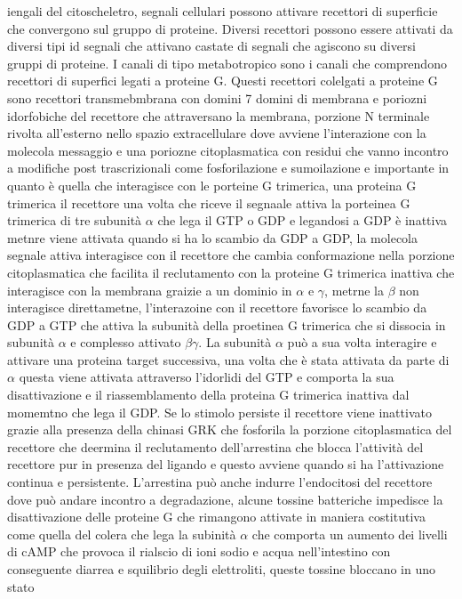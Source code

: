 iengali del citoscheletro, segnali cellulari possono attivare recettori di superficie che convergono sul gruppo di proteine. Diversi recettori possono essere attivati da diversi tipi id
segnali che attivano castate di segnali che agiscono su diversi gruppi di proteine. I canali di tipo metabotropico sono i canali che comprendono recettori di superfici legati a 
proteine G. Questi recettori colelgati a proteine G sono recettori transmebmbrana con domini 7 domini di membrana e poriozni idorfobiche del recettore che attraversano la membrana, 
porzione N terminale rivolta all'esterno nello spazio extracellulare dove avviene l'interazione con la molecola messaggio e una poriozne citoplasmatica con residui che vanno incontro 
a modifiche post trascrizionali come fosforilazione e sumoilazione e importante in quanto \`e quella che interagisce con le porteine G trimerica, una proteina G trimerica il recettore una
volta che riceve il segnaale attiva la porteinea G trimerica di tre subunit\`a $\alpha$ che lega il GTP o GDP e legandosi a GDP \`e inattiva metnre viene attivata quando si ha lo scambio 
da GDP a GDP, la molecola segnale attiva interagisce con il recettore che cambia conformazione nella porzione citoplasmatica che facilita il reclutamento con la proteine G trimerica
inattiva che interagisce con la membrana graizie a un dominio in $\alpha$ e $\gamma$, metrne la $\beta$ non interagisce direttametne, l'interazoine con il recettore favorisce lo scambio
da GDP a GTP che attiva la subunit\`a della proetinea G trimerica che si dissocia in subunit\`a $\alpha$ e complesso attivato $\beta\gamma$. La subunit\`a $\alpha$ pu\`o a sua volta
interagire e attivare una proteina target successiva, una volta che \`e stata attivata da parte di $\alpha$ questa viene attivata attraverso l'idorlidi del GTP e comporta la sua 
disattivazione e il riassemblamento della proteina G trimerica inattiva dal momemtno che lega il GDP. Se lo stimolo persiste il recettore viene inattivato grazie alla presenza della 
chinasi GRK che fosforila la porzione citoplasmatica del recettore che deermina il reclutamento dell'arrestina che blocca l'attivit\`a del recettore pur in presenza del ligando e 
questo avviene quando si ha l'attivazione continua e persistente. L'arrestina pu\`o anche indurre l'endocitosi del recettore dove pu\`o andare incontro a degradazione, alcune tossine
batteriche impedisce la disattivazione delle proteine G che rimangono attivate in maniera costitutiva come quella del colera che lega la subinit\`a $\alpha$ che comporta un aumento 
dei livelli di cAMP che provoca il rialscio di ioni sodio e acqua nell'intestino con conseguente diarrea e squilibrio degli elettroliti, queste tossine bloccano in uno stato 
